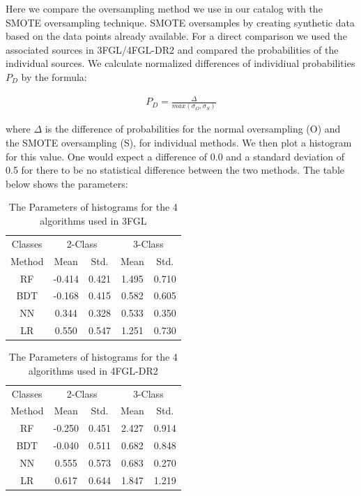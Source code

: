 Here we compare the oversampling method we use in our catalog with the SMOTE oversampling technique. SMOTE oversamples by creating synthetic data based on the data points already available. For a direct comparison we used the associated sources in 3FGL/4FGL-DR2 and compared the probabilities of the individual sources. We calculate normalized differences of individiual probabilities $P_{D}$ by the formula:

\begin{align}
P_{D}= \frac{\Delta}{max(\sigma_{O},\sigma_{S})}
\end{align}

where $\Delta$ is the difference of probabilities for the normal oversampling (O) and the SMOTE oversampling (S), for individual methods. We then plot a histogram for this value. One would expect a difference of 0.0 and a standard deviation of 0.5 for there to be no statistical difference between the two methods. The table below shows the parameters:
\begin{table}[!h]
\tiny
\centering
\renewcommand{\tabcolsep}{1mm}
\renewcommand{\arraystretch}{1.3}

\begin{tabular}{c c c c c }
\hline
\hline
Classes&\multicolumn{2}{c}{2-Class}&\multicolumn{2}{c}{3-Class}\\
Method & Mean&Std.&Mean&Std.\\
\hline
RF& -0.414 & 0.421&1.495&0.710\\
\hline
BDT&-0.168&0.415 &0.582&0.605\\
\hline
NN&0.344&0.328&0.533&0.350\\
\hline
LR&0.550&0.547&1.251&0.730\\
\end{tabular}
\vspace{2mm}
\caption{The Parameters of histograms for the 4 algorithms used in 3FGL
}
\label{tab:compO}
\end{table}





\begin{table}[!h]
\tiny
\centering
\renewcommand{\tabcolsep}{1mm}
\renewcommand{\arraystretch}{1.3}

\begin{tabular}{c c c c c}
\hline
\hline
Classes&\multicolumn{2}{c}{2-Class}&\multicolumn{2}{c}{3-Class}\\
Method & Mean&Std.&Mean&Std.\\
\hline
RF& -0.250 & 0.451&2.427&0.914\\
\hline
BDT&-0.040&0.511 &0.682&0.848\\
\hline
NN&0.555&0.573&0.683&0.270\\
\hline
LR&0.617&0.644&1.847&1.219\\
\end{tabular}
\vspace{2mm}
\caption{The Parameters of histograms for the 4 algorithms used in 4FGL-DR2
}
\label{tab:compO}
\end{table}

